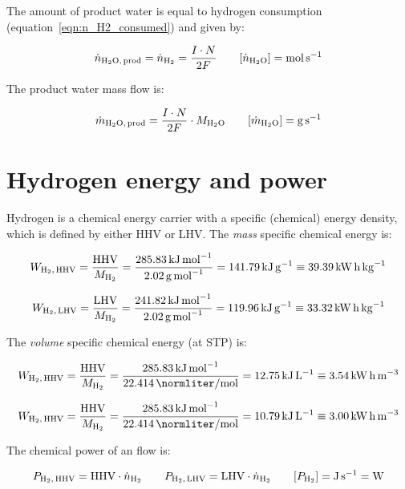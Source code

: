 \documentclass[11pt,a4paper,english,twoside]{scrreprt}
\begin{document}
The amount of product water is equal to hydrogen consumption (equation~\ref{eqn:n_H2_consumed}) and given by:

\[\dot n_{\ce{H2O},\,\text{prod}} = \dot n_{\ce{H2}} = \frac{I\cdot N}{2F} \qquad [\dot n_{\ce{H2O}}]=\si{\mole\per\second} \]

The product water mass flow is:

\begin{equation}
  \label{eqn:mdot_water}
  \dot m_{\ce{H2O},\,\text{prod}} = \frac{I\cdot N}{2F} \cdot M_{\ce{H2O}} \qquad [\dot m_{\ce{H2O}}]=\si{\gram\per\second}
\end{equation}


\section{Hydrogen energy and power}
\label{sec:HyEnergyPower}

Hydrogen is a chemical energy carrier with a specific (chemical) energy density, which is defined by either HHV or LHV. The {\em mass} specific chemical energy is:

\[W_{\ce{H2},\,\text{HHV}} =\frac{\text{HHV}}{M_{\ce{H2}}} = \frac{\SI{285.83}{\kilo\joule\per\mole}}{\SI{2.02}{\gram\per\mole}} = \SI{141.79}{\kilo\joule\per\gram} \equiv \SI[sticky-per]{39.39}{\kWh\per\kilo\gram}\]

\[W_{\ce{H2},\,\text{LHV}} =\frac{\text{LHV}}{M_{\ce{H2}}} = \frac{\SI{241.82}{\kilo\joule\per\mole}}{\SI{2.02}{\gram\per\mole}} = \SI{119.96}{\kilo\joule\per\gram} \equiv \SI[sticky-per]{33.32}{\kWh\per\kilo\gram}\]

The {\em volume} specific chemical energy (at STP) is:

\[W_{\ce{H2},\,\text{HHV}} =\frac{\text{HHV}}{M_{\ce{H2}}} = \frac{\SI{285.83}{\kilo\joule\per\mole}}{\SI{22.414}{\normliter\per\mole}} = \SI{12.75}{\kilo\joule\per\liter} \equiv \SI[sticky-per]{3.54}{\kWh\per\cubic\meter}\]

\[W_{\ce{H2},\,\text{HHV}} =\frac{\text{HHV}}{M_{\ce{H2}}} = \frac{\SI{285.83}{\kilo\joule\per\mole}}{\SI{22.414}{\normliter\per\mole}} = \SI{10.79}{\kilo\joule\per\liter} \equiv \SI[sticky-per]{3.00}{\kWh\per\cubic\meter}\]

The chemical power of an  flow is:

\begin{equation}
  \label{eqn:P_H2_flow}
  P_{\ce{H2},\,\text{HHV}} = {\text{HHV}} \cdot \dot{n}_{\ce{H2}} \qquad 
  P_{\ce{H2},\,\text{LHV}} = {\text{LHV}} \cdot \dot{n}_{\ce{H2}} \qquad [P_{\ce{H2}}]=\si{\joule\per\second}=\si{\watt} 
\end{equation}
\end{document}
